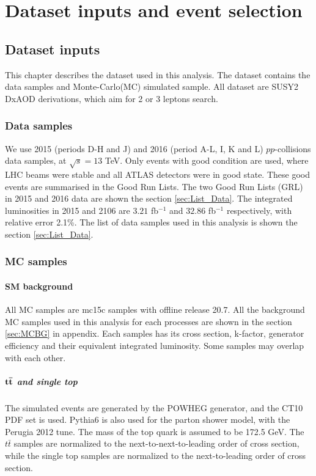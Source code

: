 \chapter{Dataset inputs and event selection}
\label{ch:event}

\section{Dataset inputs}
This chapter describes the dataset used in this analysis.
The dataset contains the data samples and Monte-Carlo(MC) simulated sample.
All dataset are SUSY2 DxAOD derivations, which aim for 2 or 3 leptons search.

\subsection{Data samples}
We use 2015 (periods D-H and J) and 2016 (period A-L, I, K and L) $pp$-collisions data samples, at $\sqrt s=13$ TeV.
Only events with good condition are used, where LHC beams were stable and all ATLAS detectors were in good state.
These good events are summarised in the Good Run Lists.
The two Good Run Lists (GRL) in 2015 and 2016 data are shown the section \ref{sec:List_Data}.
The integrated luminosities in 2015 and 2106 are $3.21$ fb$^{-1}$ and $32.86$ fb$^{-1}$ respectively, with relative error 2.1\%.
The list of data samples used in this analysis is shown the section \ref{sec:List_Data}.

\subsection{MC samples}
\subsubsection{SM background}
All MC samples are mc15c samples with offline release 20.7.
All the background MC samples used in this analysis for each processes are shown in the section \ref{sec:MCBG} in appendix.
Each samples has its cross section, k-factor, generator efficiency and their equivalent integrated luminosity.
Some samples may overlap with each other.

\paragraph{$\bf t\bar{t}$ and single top}
The simulated events are generated by the {\sc POWHEG} generator, and the CT10 PDF set is used.
{\sc Pythia6} is also used for the parton shower model, with the {\sc Perugia} 2012 tune.
The mass of the top quark is assumed to be 172.5 GeV.
The $t\bar{t}$ samples are normalized to the next-to-next-to-leading order of cross section, while the single top samples are normalized to the next-to-leading order of cross section.

